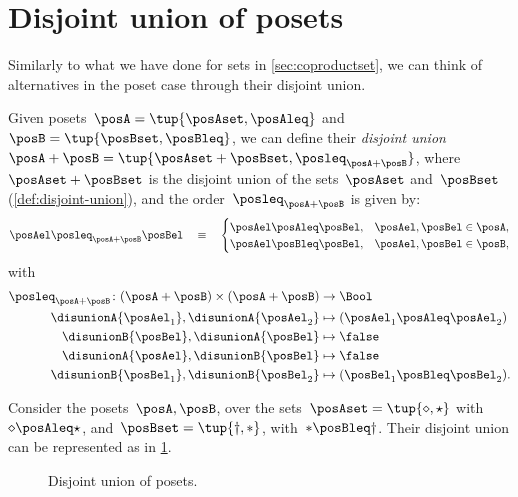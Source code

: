 
\section{Disjoint union of posets}
Similarly to what we have done for sets in \cref{sec:coproductset}, we can think of alternatives in the poset case through their disjoint union.

\begin{definition}
    Given posets~$\posA=\tup{\posAset, \posAleq}$ and~$\posB=\tup{\posBset, \posBleq}$, we can define their \emph{disjoint union}~$\posA+\posB=\tup{\posAset + \posBset, \posleq_{\posA + \posB}}$, where~$\posAset + \posBset$ is the disjoint union of the sets~$\posAset$ and~$\posBset$ (\cref{def:disjoint-union}), and the order~$\posleq_{\posA + \posB}$ is given by:
    \begin{equation}
        \posAel \posleq_{\posA + \posB} \posBel \quad\equiv\quad
        \begin{cases}
            \posAel \posAleq \posBel, & \posAel,\posBel \in \posA, \\
            \posAel \posBleq \posBel, & \posAel,\posBel \in \posB,
        \end{cases}
    \end{equation}
    with
    \begin{equation}
        \begin{aligned}
            \posleq_{\posA+\posB}\colon (\posA+\posB)\times (\posA+\posB) & \to \Bool                              \\
            \disunionA{\posAel_1},\disunionA{\posAel_2}                   & \mapsto (\posAel_1\posAleq \posAel_2)  \\
            \disunionB{\posBel},\disunionA{\posBel}                       & \mapsto \false                         \\
            \disunionA{\posAel},\disunionB{\posBel}                       & \mapsto \false                         \\
            \disunionB{\posBel_1},\disunionB{\posBel_2}                   & \mapsto (\posBel_1\posBleq \posBel_2).
        \end{aligned}
    \end{equation}
\end{definition}

\begin{example}
    Consider the posets~$\posA,\posB$, over the sets~$\posAset=\tup{\diamond, \star}$ with~$\diamond \posAleq \star$, and~$\posBset=\tup{\dagger,\ast}$, with~$\ast \posBleq \dagger$.
    Their disjoint union can be represented as in \cref{fig:poset-coproduct}.

    \begin{figure}[h!]
        \centering
        \caption{Disjoint union of posets.}
        \label{fig:poset-coproduct}
    \end{figure}
\end{example}

